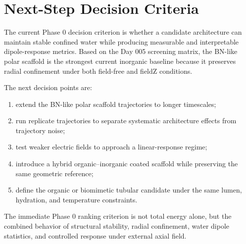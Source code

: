\documentclass[11pt,letterpaper]{article}
\begin{document}
\section{Next-Step Decision Criteria}

The current Phase 0 decision criterion is whether a candidate architecture can maintain stable confined water while producing measurable and interpretable dipole-response metrics. Based on the Day 005 screening matrix, the BN-like polar scaffold is the strongest current inorganic baseline because it preserves radial confinement under both field-free and fieldZ conditions.

The next decision points are:

\begin{enumerate}
    \item extend the BN-like polar scaffold trajectories to longer timescales;
    \item run replicate trajectories to separate systematic architecture effects from trajectory noise;
    \item test weaker electric fields to approach a linear-response regime;
    \item introduce a hybrid organic--inorganic coated scaffold while preserving the same geometric reference;
    \item define the organic or biomimetic tubular candidate under the same lumen, hydration, and temperature constraints.
\end{enumerate}

The immediate Phase 0 ranking criterion is not total energy alone, but the combined behavior of structural stability, radial confinement, water dipole statistics, and controlled response under external axial field.
\end{document}
